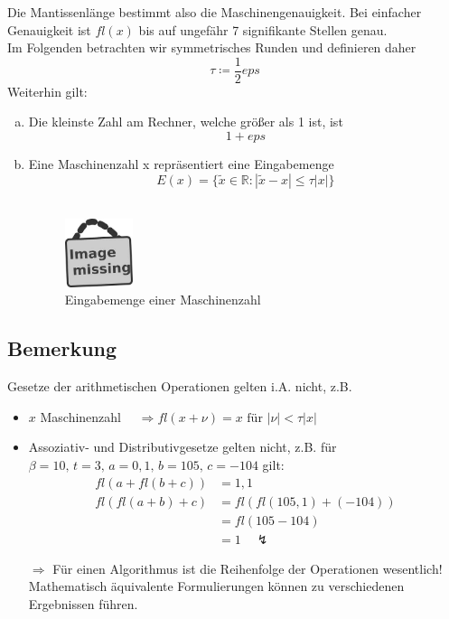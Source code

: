 \documentclass[ngerman,fontsize=11pt, paper=a4, parskip=half, titlepage=true, toc=bib]{scrbook}
\newcommand{\R}{\mathds{R}}
\begin{document}
  Die Mantissenlänge bestimmt also die Maschinengenauigkeit. Bei einfacher Genauigkeit ist $fl(x)$ bis auf ungefähr 7 signifikante Stellen genau. \\
  Im Folgenden betrachten wir symmetrisches Runden und definieren daher
  \[ \tau \coloneqq \frac{1}{2}eps\]
  Weiterhin gilt:
  \begin{enumerate}[a)]
  \item Die kleinste Zahl am Rechner, welche größer als 1 ist, ist
    \[ 1 + eps \]
  \item Eine Maschinenzahl x repräsentiert eine Eingabemenge
    \[  E(x) = \{\widetilde{x} \in \R : |\widetilde{x}-x| \leq \tau|x|\} \] \\
    \begin{figure}
      \parbox{\linewidth}{
        \centering
        \includegraphics[width=2cm]{images/image_missing.jpg}
      }
      \caption{Eingabemenge einer Maschinenzahl}
    \end{figure}
  \end{enumerate}

  \subsection{Bemerkung} \label{3.1.7}
  Gesetze der arithmetischen Operationen gelten i.A. nicht, z.B.
  \begin{itemize}
  \item 	$x$ Maschinenzahl $\quad \Rightarrow fl(x+\nu) = x \text{     für }|\nu| < \tau |x|$
  \item Assoziativ- und Distributivgesetze gelten nicht, z.B. für $\beta = 10, \, t=3, \, a=0,1 ,\, b= 105 , \, c= -104$ gilt:
    \begin{align*}
      fl(a+fl(b+c)) &= 1,1 \\
      fl(fl(a+b)+c) &= fl(fl(105,1) + (-104) ) \\
                    &= fl(105-104) \\
                    &= 1 \quad \lightning
    \end{align*}
  \item[ $\Rightarrow$] Für einen Algorithmus ist die Reihenfolge der Operationen wesentlich!
    Mathematisch äquivalente Formulierungen können zu verschiedenen Ergebnissen führen.
  \end{itemize}
\end{document}
